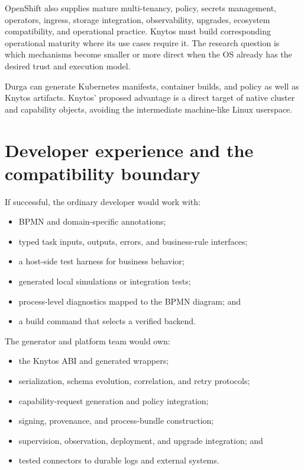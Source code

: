 OpenShift also supplies mature multi-tenancy, policy, secrets management,
operators, ingress, storage integration, observability, upgrades, ecosystem
compatibility, and operational practice. Knytos must build corresponding
operational maturity where its use cases require it. The research question is
which mechanisms become smaller or more direct when the OS already has the
desired trust and execution model.

Durga can generate Kubernetes manifests, container builds, and policy as well as
Knytos artifacts. Knytos' proposed advantage is a direct target of native cluster
and capability objects, avoiding the intermediate machine-like Linux userspace.

\section{Developer experience and the compatibility boundary}

If successful, the ordinary developer would work with:

\begin{itemize}
    \item BPMN and domain-specific annotations;
    \item typed task inputs, outputs, errors, and business-rule interfaces;
    \item a host-side test harness for business behavior;
    \item generated local simulations or integration tests;
    \item process-level diagnostics mapped to the BPMN diagram; and
    \item a build command that selects a verified backend.
\end{itemize}

The generator and platform team would own:

\begin{itemize}
    \item the Knytos ABI and generated wrappers;
    \item serialization, schema evolution, correlation, and retry protocols;
    \item capability-request generation and policy integration;
    \item signing, provenance, and process-bundle construction;
    \item supervision, observation, deployment, and upgrade integration; and
    \item tested connectors to durable logs and external systems.
\end{itemize}

